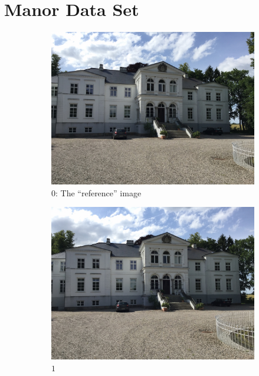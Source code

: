 \section{Manor Data Set}
\FloatBarrier
\begin{figure}[h]
   \begin{subfigure}[t]{.33\textwidth}
      \includegraphics[width=\textwidth]{gfx/manor_imgs/0_ref.JPG}
      \caption{$0$: The ``reference'' image}
   \end{subfigure}
   \begin{subfigure}[t]{.33\textwidth}
      \includegraphics[width=\textwidth]{gfx/manor_imgs/1.JPG}
      \caption{$1$}
   \end{subfigure}
   \begin{subfigure}[t]{.33\textwidth}

\end{subfigure}
\end{figure}
